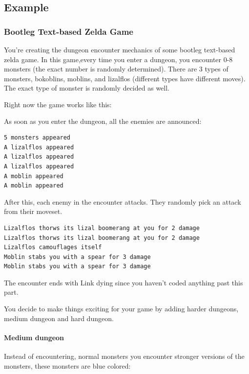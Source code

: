 \subsection{Example}\label{creational-patterns.md__example-1}

\subsubsection{Bootleg Text-based Zelda
Game}\label{creational-patterns.md__bootleg-text-based-zelda-game}

You're creating the dungeon encounter mechanics of some bootleg
text-based zelda game. In this game,every time you enter a dungeon, you
encounter 0-8 monsters (the exact number is randomly determined). There
are 3 types of monsters, bokoblins, moblins, and lizalflos (different
types have different moves). The exact type of monster is randomly
decided as well.

Right now the game works like this:

As soon as you enter the dungeon, all the enemies are announced:

\begin{verbatim}
5 monsters appeared
A lizalflos appeared
A lizalflos appeared
A lizalflos appeared
A moblin appeared
A moblin appeared
\end{verbatim}

After this, each enemy in the encounter attacks. They randomly pick an
attack from their moveset.

\begin{verbatim}
Lizalflos thorws its lizal boomerang at you for 2 damage
Lizalflos thorws its lizal boomerang at you for 2 damage
Lizalflos camouflages itself
Moblin stabs you with a spear for 3 damage
Moblin stabs you with a spear for 3 damage
\end{verbatim}

The encounter ends with Link dying since you haven't coded anything past
this part.

You decide to make things exciting for your game by adding harder
dungeons, medium dungeon and hard dungeon.

\paragraph{Medium dungeon}\label{creational-patterns.md__medium-dungeon}

Instead of encountering, normal monsters you encounter stronger versions
of the monsters, these monsters are blue colored:

